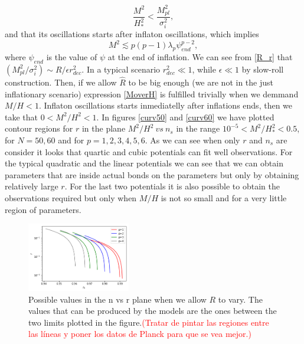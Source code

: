\documentclass[amssymb,twocolumn,prd,nofootinbib,showpacs]{revtex4-1}
\begin{document}
\begin{equation}\label{MoverH}
\frac{M^2}{H^2_*}<\frac{M_{pl}^2}{\sigma_i^2},
\end{equation} 
and that its oscillations starts after inflaton oscillations, which implies
\begin{equation}\label{M2curv}
M^2\lesssim p(p-1)\lambda_p \psi_{end}^{p-2},
\end{equation}
where $\psi_{end}$ is the value of $\psi$ at the end of inflation. We can see from \eqref{R_r} that $(M_{pl}^2/\sigma_i^2)\sim R/\epsilon r_{dec}^2$. In a typical scenario $r_{dec}^2\ll 1$, while $\epsilon\ll 1$ by slow-roll construction. Then, if we allow $\hat R$ to be big enough (we are not in the just inflationary scenario) expression \eqref{MoverH} is fulfilled trivially when we demmand $M/H<1$. Inflaton oscillations starts inmediatelly after inflations ends, then we take that $0<M^2/H^2<1$. In figures \ref{curv50} and \ref{curv60} we have plotted contour regions for $r$ in the plane $M^2/H^2\ vs\ n_s$ in the range $10^{-5}<M^2/H_*^2<0.5$, for $N=50,60$ and for $p=1,2,3,4,5,6$. As we can see when only $r$ and $n_s$ are consider it looks that quartic and cubic potentials can fit well observations. For the typical quadratic and the linear potentials we can see that we can obtain parameters that are inside actual bonds on the parameters but only by obtaining relatively large $r$. For the last two potentials it is also possible to obtain the observations required but only when $M/H$ is not so small and for a very little region of parameters.   
\begin{figure}
\centering
\includegraphics[width=0.4\textwidth]{nvsr}
\caption{Possible values in the n vs r plane when we allow $R$ to vary. The values that can be produced by the models are the ones between the two limits plotted in the figure.\textcolor{red}{(Tratar de pintar las regiones entre las l\'ineas y poner los datos de Planck para que se vea mejor.)}}
\label{nvsr}
\end{figure}
%
\end{document}
